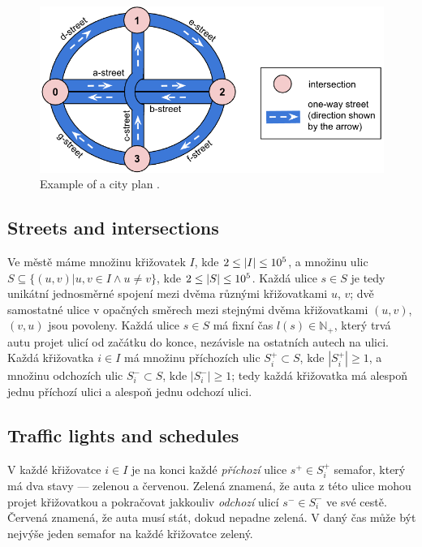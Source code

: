 \begin{figure}
    \centering
    \includegraphics[width=\linewidth]{img/hashcode/figure1.png}
    \caption[Example of a city plan]{
        Example of a city plan \cite{google_coding_competitions}.
    }
    \label{fig:hashcode_city_plan}
\end{figure}

\subsection{Streets and intersections}
Ve městě máme množinu křižovatek
$I$, kde $2 \leq \left|{I}\right| \leq 10^5$,
a množinu ulic 
$S \subseteq \{(u, v) | u,v \in I \land u \neq v\}$, kde $2 \leq \left|{S}\right| \leq 10^5$.
Každá ulice $s \in S$ je tedy unikátní jednosměrné spojení mezi dvěma různými křižovatkami $u$, $v$; dvě samostatné ulice v opačných směrech mezi stejnými dvěma křižovatkami $(u, v)$, $(v, u)$ jsou povoleny. Každá ulice $s \in S$ má fixní čas $l(s) \in \mathbb{N}_+$, který trvá autu projet ulicí od začátku do konce, nezávisle na ostatních autech na ulici.
Každá křižovatka $i \in I$ má množinu příchozích ulic $S_i^+ \subset S$, kde $|S_i^+| \geq 1$, a množinu odchozích ulic $S_i^- \subset S$, kde $|S_i^-| \geq 1$; tedy každá křižovatka má alespoň jednu příchozí ulici a alespoň jednu odchozí ulici.

\subsection{Traffic lights and schedules}
V každé křižovatce $i \in I$ je na konci každé \textit{příchozí} ulice $s^+ \in S_i^+$ semafor, který má dva stavy --- zelenou a červenou. Zelená znamená, že auta z této ulice mohou projet křižovatkou a pokračovat jakkouliv \textit{odchozí} ulicí $s^- \in S_i^-$ ve své cestě. Červená znamená, že auta musí stát, dokud nepadne zelená. V daný čas může být nejvýše jeden semafor na každé křižovatce zelený.

